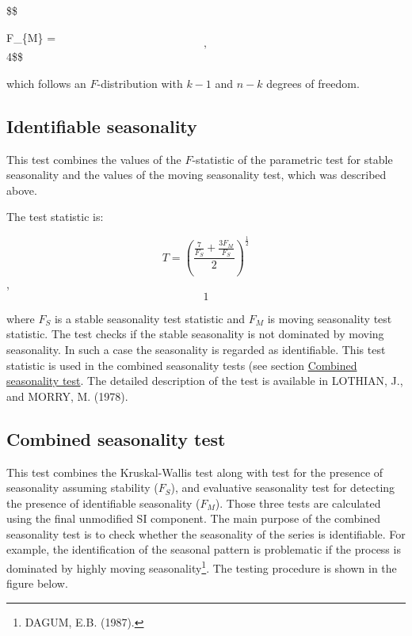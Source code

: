 \documentclass[
  letterpaper,
  DIV=11,
  numbers=noendperiod]{scrreprt}
\begin{document}
\$\$

F\_\{M\} =
\[, \]4\$\$

which follows an \(F\)-distribution with \(k - 1\) and \(n - k\) degrees
of freedom.

\hypertarget{identifiable-seasonality}{%
\subsection{Identifiable seasonality}\label{identifiable-seasonality}}

This test combines the values of the \(F\)-statistic of the parametric
test for stable seasonality and the values of the moving seasonality
test, which was described above.

The test statistic is:

\[
  T = \left( \frac{\frac{7}{F_{S}} + \frac{3F_{M}}{F_{S}}}{2} \right)^{\frac{1}{2}}
  \], \[1\]

where \(F_{S}\) is a stable seasonality test statistic and \(F_{M}\) is
moving seasonality test statistic. The test checks if the stable
seasonality is not dominated by moving seasonality. In such a case the
seasonality is regarded as identifiable. This test statistic is used in
the combined seasonality tests (see section
\href{../theory/Tests_combined.html}{Combined seasonality test}. The
detailed description of the test is available in LOTHIAN, J., and MORRY,
M. (1978).

\hypertarget{combined-seasonality-test}{%
\subsection{Combined seasonality test}\label{combined-seasonality-test}}

This test combines the Kruskal-Wallis test along with test for the
presence of seasonality assuming stability (\(F_{S}\)), and evaluative
seasonality test for detecting the presence of identifiable seasonality
(\(F_{M}\)). Those three tests are calculated using the final unmodified
SI component. The main purpose of the combined seasonality test is to
check whether the seasonality of the series is identifiable. For
example, the identification of the seasonal pattern is problematic if
the process is dominated by highly moving seasonality\footnote{DAGUM,
  E.B. (1987).}. The testing procedure is shown in the figure below.
\end{document}
